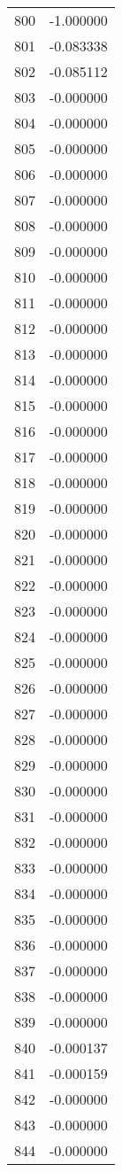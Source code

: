 \documentclass[12pt]{article}
\begin{document}
\begin{longtable}{@{}cc@{}}
800 & -1.000000 \\
801 & -0.083338 \\
802 & -0.085112 \\
803 & -0.000000 \\
804 & -0.000000 \\
805 & -0.000000 \\
806 & -0.000000 \\
807 & -0.000000 \\
808 & -0.000000 \\
809 & -0.000000 \\
810 & -0.000000 \\
811 & -0.000000 \\
812 & -0.000000 \\
813 & -0.000000 \\
814 & -0.000000 \\
815 & -0.000000 \\
816 & -0.000000 \\
817 & -0.000000 \\
818 & -0.000000 \\
819 & -0.000000 \\
820 & -0.000000 \\
821 & -0.000000 \\
822 & -0.000000 \\
823 & -0.000000 \\
824 & -0.000000 \\
825 & -0.000000 \\
826 & -0.000000 \\
827 & -0.000000 \\
828 & -0.000000 \\
829 & -0.000000 \\
830 & -0.000000 \\
831 & -0.000000 \\
832 & -0.000000 \\
833 & -0.000000 \\
834 & -0.000000 \\
835 & -0.000000 \\
836 & -0.000000 \\
837 & -0.000000 \\
838 & -0.000000 \\
839 & -0.000000 \\
840 & -0.000137 \\
841 & -0.000159 \\
842 & -0.000000 \\
843 & -0.000000 \\
844 & -0.000000 \\

\end{longtable}
\end{document}
